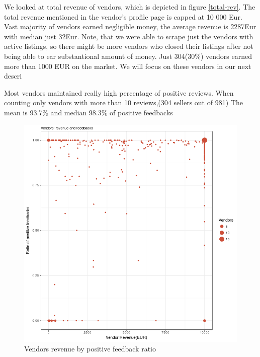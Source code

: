 \documentclass[
  digital, %
  table,   %
  lof,     %
  lot,     %
  oneside
]{fithesis3}
\begin{document}
We looked at total revenue of vendors, which is depicted in figure \ref{total-rev}. 
The total revenue mentioned in the vendor's profile page is capped at 10 000 Eur.
Vast majority of vendors earned negligible money,
the average revenue is 2287Eur with median just 32Eur.
Note, that we were able to scrape just the vendors with active listings,
so there might be more vendors who closed their listings after
not being able to ear substantional amount of money.
Just 304(30\%) vendors earned more than 1000 EUR on the market.
We will focus on these vendors in our next descri

Most vendors maintained really high percentage of positive reviews.
When counting only vendors with more than 10 reviews,(304 sellers out of 981)
The mean is 93.7\% and median 98.3\% of positive feedbacks
 
\begin{figure}[!htb]
    \centering
    \includegraphics[scale=0.4]{revpos}
    \caption{Vendors revenue by positive feedback ratio}
    \label{revpos}
\end{figure}
\end{document}
